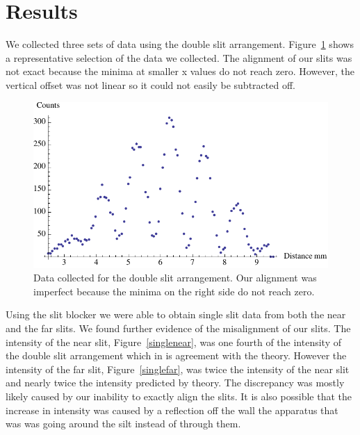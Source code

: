 \documentclass[prb,preprint]{revtex4-1}
\begin{document}
\section{Results}

We collected three sets of data using the double slit arrangement. Figure~\ref{doubleslit} shows a representative selection of the data we collected. The alignment of our slits was not exact because the minima at smaller x values do not reach zero. However, the vertical offset was not linear so it could not easily be subtracted off.

\begin{figure}[h!]
\centering
\includegraphics[width=6in]{doubleslit.pdf}
\caption{Data collected for the double slit arrangement. Our alignment was imperfect because the minima on the right side do not reach zero.}
\label{doubleslit}
\end{figure}

Using the slit blocker we were able to obtain single slit data from both the near and the far slits. We found further evidence of the misalignment of our slits. The intensity of the near slit, Figure~\ref{singlenear}, was one fourth of the intensity of the double slit arrangement which in is agreement with the theory. However the intensity of the far slit, Figure~\ref{singlefar}, was twice the intensity of the near slit and nearly twice the intensity predicted by theory. The discrepancy was mostly likely caused by our inability to exactly align the slits. It is also possible that the increase in intensity was caused by a reflection off the wall the apparatus that was was going around the silt instead of through them.
\end{document}
